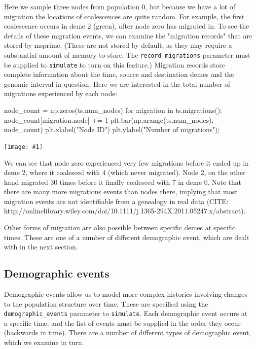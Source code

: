 \documentclass[graybox]{svmult}
\newcommand{\includenbimage}[1]{\begin{center}\texttt{[image: \#1]}\end{center}}
\begin{document}
    Here we sample three nodes from population 0, but because we have a lot
of migration the locations of coalescences are quite random. For
example, the first coalescence occurs in deme 2 (green), after node zero
has migrated in. To see the details of these migration events, we can
examine the "migration records" that are stored by msprime. (These are
not stored by default, as they may require a substantial amount of
memory to store. The \texttt{record\_migrations} parameter must be
supplied to \texttt{simulate} to turn on this feature.) Migration
records store complete information about the time, source and
destination demes and the genomic interval in question. Here we are
interested in the total number of migrations experienced by each node:

\begin{pythoncode}
node_count = np.zeros(ts.num_nodes)
for migration in ts.migrations():
    node_count[migration.node] += 1
plt.bar(np.arange(ts.num_nodes), node_count)
plt.xlabel("Node ID")
plt.ylabel("Number of migrations");
\end{pythoncode}
\includenbimage{images/simulations_30_0.pdf}

We can see that node zero experienced very few migrations before it
ended up in deme 2, where it coalesced with 4 (which never migrated).
Node 2, on the other hand migrated 30 times before it finally coalesced
with 7 in deme 0. Note that there are many more migrations events than
nodes there, implying that most migration events are not identifiable
from a genealogy in real data (CITE:
http://onlinelibrary.wiley.com/doi/10.1111/j.1365-294X.2011.05247.x/abstract).

Other forms of migration are also possible between specific demes at
specific times. These are one of a number of different demographic
event, which are dealt with in the next section.

\subsection{Demographic events}\label{demographic-events}

Demographic events allow us to model more complex histories involving
changes to the population structure over time. These are specified using
the \texttt{demographic\_events} parameter to \texttt{simulate}. Each
demographic event occurs at a specific time, and the list of events must
be supplied in the order they occur (backwards in time). There are a
number of different types of demographic event, which we examine in
turn.
\end{document}
